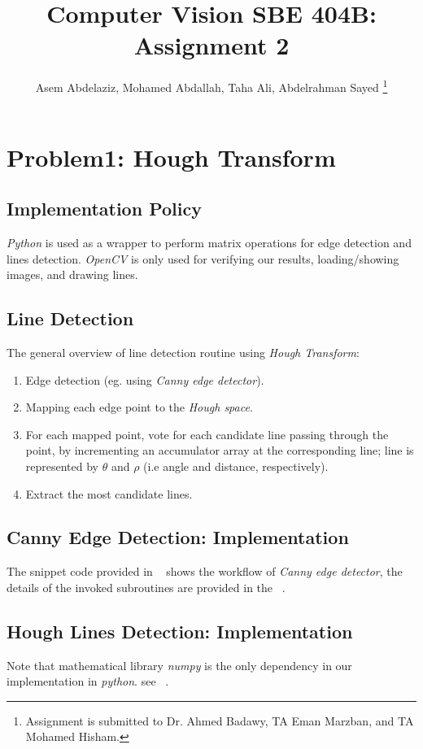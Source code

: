 \documentclass[letterpaper, 12 pt, conference ,onecolumn]{ieeeconf}  %
\title{
Computer Vision SBE 404B: Assignment 2
}
\author{
 Asem Abdelaziz,
 Mohamed Abdallah, 
 Taha Ali,
 Abdelrahman Sayed  
 \thanks{Assignment is submitted to Dr. Ahmed Badawy, TA Eman Marzban, and TA Mohamed Hisham.}
}
\begin{document}
\maketitle



\section{Problem1: Hough Transform}
\subsection*{Implementation Policy}\label{implementation-policy}

\textit{Python} is used as a wrapper to perform matrix operations for edge detection and lines detection. \textit{OpenCV} is only used for verifying our results, loading/showing images, and drawing lines.
 
\subsection{Line Detection} 
The general overview of line detection routine using \textit{Hough Transform}:
\begin{enumerate}
\item Edge detection (eg. using \textit{Canny edge detector}).
\item Mapping each edge point to the \textit{Hough space}.
\item For each mapped point, vote for each candidate line passing through the point, by incrementing an accumulator array at the corresponding line; line is represented by $\theta$ and $\rho$ (i.e angle and distance, respectively).
\item Extract the most candidate lines.
\end{enumerate} 

\subsection*{Canny Edge Detection: Implementation}\label{canny-edge-detection}
The snippet code provided in ~ shows the workflow of \textit{Canny edge detector}, the details of the invoked subroutines are provided in the ~.

\subsection*{Hough Lines Detection: Implementation }
Note that mathematical library \textit{numpy} is the only dependency in our implementation in \textit{python}. see ~.
\end{document}
